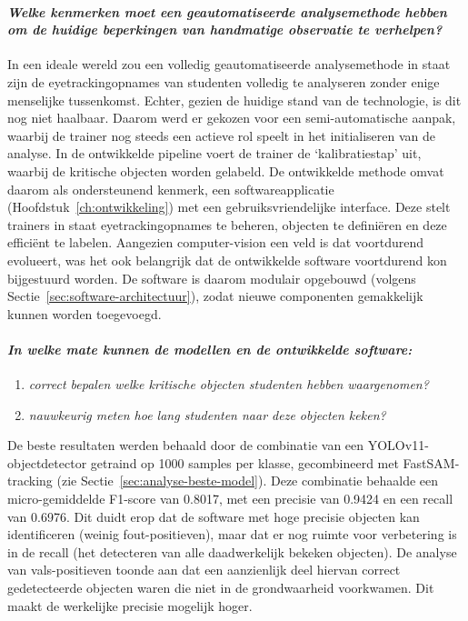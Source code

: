 \paragraph{\textit{Welke kenmerken moet een geautomatiseerde analysemethode hebben om de huidige beperkingen van handmatige observatie te verhelpen?}}
In een ideale wereld zou een volledig geautomatiseerde analysemethode in staat zijn  
de eyetrackingopnames van studenten volledig te analyseren zonder enige menselijke tussenkomst.
Echter, gezien de huidige stand van de technologie, is dit nog niet haalbaar.
Daarom werd er gekozen voor een semi-automatische aanpak, waarbij de trainer nog steeds een actieve rol speelt in het initialiseren van de analyse.
In de ontwikkelde pipeline voert de trainer de `kalibratiestap' uit, waarbij de kritische objecten worden gelabeld. 
De ontwikkelde methode omvat daarom als ondersteunend kenmerk, een softwareapplicatie (Hoofdstuk~\ref{ch:ontwikkeling}) met een gebruiksvriendelijke interface. 
Deze stelt trainers in staat eyetrackingopnames te beheren, objecten te definiëren en deze efficiënt te labelen.
Aangezien computer-vision een veld is dat voortdurend evolueert, was het ook belangrijk dat de ontwikkelde software voortdurend kon bijgestuurd worden.
De software is daarom modulair opgebouwd (volgens Sectie~\ref{sec:software-architectuur}), zodat nieuwe componenten gemakkelijk kunnen worden toegevoegd.

\paragraph{\textit{In welke mate kunnen de modellen en de ontwikkelde software:}}
\begin{enumerate}
    \item \textit{correct bepalen welke kritische objecten studenten hebben waargenomen?}
    \item \textit{nauwkeurig meten hoe lang studenten naar deze objecten keken?}
\end{enumerate}
De beste resultaten werden behaald door de combinatie van een YOLOv11-object\-detector getraind op 1000 samples per klasse, gecombineerd met FastSAM-tra\-cking (zie Sectie~\ref{sec:analyse-beste-model}).
Deze combinatie behaalde een micro-gemiddelde F1-score van 0.8017, met een precisie van 0.9424 en een recall van 0.6976.
Dit duidt erop dat de software met hoge precisie objecten kan identificeren (weinig fout-positieven), 
maar dat er nog ruimte voor verbetering is in de recall (het detecteren van alle daadwerkelijk bekeken objecten). 
De analyse van vals-positieven toonde aan dat een aanzienlijk deel hiervan correct gedetecteerde objecten waren 
die niet in de grondwaarheid voorkwamen. Dit maakt de werkelijke precisie mogelijk hoger.

